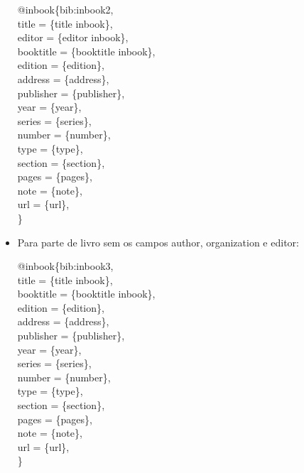 \documentclass[a4paper,12pt,oneside,onecolumn]{article}
\newcommand{\formato}[1]{\begin{flushleft}{#1}\end{flushleft}}
\begin{document}
\begin{itemize}
\formato{
  @inbook\{bib:inbook2,\\
    title = \{title inbook\},\\
    editor = \{editor inbook\},\\
    booktitle = \{booktitle inbook\},\\
    edition = \{edition\},\\
    address = \{address\},\\
    publisher = \{publisher\},\\
    year = \{year\},\\
    series = \{series\},\\
    number = \{number\},\\
    type = \{type\},\\
    section = \{section\},\\
    pages = \{pages\},\\
    note = \{note\},\\
    url = \{url\},\\
  \}
}

\item Para parte de livro sem os campos author, organization e editor: \formato{\citetext{bib:inbook3}}

\formato{
  @inbook\{bib:inbook3,\\
    title = \{title inbook\},\\
    booktitle = \{booktitle inbook\},\\
    edition = \{edition\},\\
    address = \{address\},\\
    publisher = \{publisher\},\\
    year = \{year\},\\
    series = \{series\},\\
    number = \{number\},\\
    type = \{type\},\\
    section = \{section\},\\
    pages = \{pages\},\\
    note = \{note\},\\
    url = \{url\},\\
  \}
}
\end{itemize}
\end{document}
